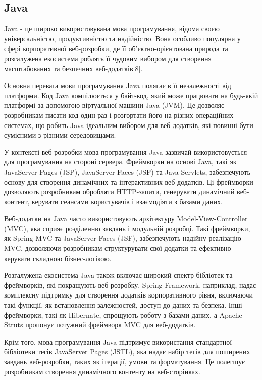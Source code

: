 \subsection{Java}
\label{subsec:java-subsection}

Java - це широко використовувана мова програмування, відома своєю універсальністю, продуктивністю та надійністю. Вона особливо популярна у сфері корпоративної веб-розробки, де її об'єктно-орієнтована природа та розгалужена екосистема роблять її чудовим вибором для створення масштабованих та безпечних веб-додатків[8].

Основна перевага мови програмування Java полягає в її незалежності від платформи. Код Java компілюється у байт-код, який може працювати на будь-якій платформі за допомогою віртуальної машини Java (JVM). Це дозволяє розробникам писати код один раз і розгортати його на різних операційних системах, що робить Java ідеальним вибором для веб-додатків, які повинні бути сумісними з різними середовищами.

У контексті веб-розробки мова програмування Java зазвичай використовується для програмування на стороні сервера. Фреймворки на основі Java, такі як JavaServer Pages (JSP), JavaServer Faces (JSF) та Java Servlets, забезпечують основу для створення динамічних та інтерактивних веб-додатків. Ці фреймворки дозволяють розробникам обробляти HTTP-запити, генерувати динамічний веб-контент, керувати сеансами користувачів і взаємодіяти з базами даних.

Веб-додатки на Java часто використовують архітектуру Model-View-Controller (MVC), яка сприяє розділенню завдань і модульній розробці. Такі фреймворки, як Spring MVC та JavaServer Faces (JSF), забезпечують надійну реалізацію MVC, дозволяючи розробникам структурувати свої додатки та ефективно керувати складною бізнес-логікою.

Розгалужена екосистема Java також включає широкий спектр бібліотек та фреймворків, які покращують веб-розробку. Spring Framework, наприклад, надає комплексну підтримку для створення додатків корпоративного рівня, включаючи такі функції, як встановлення залежностей, доступ до даних та безпека. Інші фреймворки, такі як Hibernate, спрощують роботу з базами даних, а Apache Struts пропонує потужний фреймворк MVC для веб-додатків.

Крім того, мова програмування Java підтримує використання стандартної бібліотеки тегів JavaServer Pages (JSTL), яка надає набір тегів для поширених завдань веб-розробки, таких як ітерації, умови та форматування. Це полегшує розробникам створення динамічного контенту на веб-сторінках.

